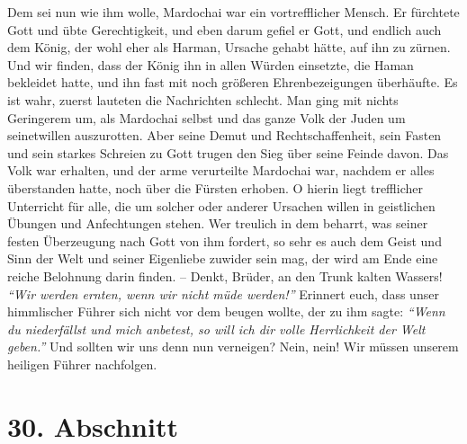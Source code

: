 Dem sei nun wie ihm wolle, Mardochai war ein vortrefflicher Mensch. Er fürchtete
Gott und übte Gerechtigkeit, und eben darum gefiel er Gott, und endlich auch dem
König, der wohl eher als Harman, Ursache gehabt hätte, auf ihn zu zürnen. Und
wir finden, dass der König ihn in allen Würden einsetzte, die Haman bekleidet
hatte, und ihn fast mit noch größeren Ehrenbezeigungen überhäufte. Es ist wahr,
zuerst lauteten die Nachrichten schlecht. Man ging mit nichts Geringerem um, als
Mardochai selbst und das ganze Volk der Juden um seinetwillen auszurotten. Aber
seine Demut und Rechtschaffenheit, sein Fasten und sein starkes
Schreien zu
Gott trugen den Sieg über seine Feinde davon. Das Volk war erhalten, und der
arme
verurteilte Mardochai war, nachdem er alles überstanden hatte, noch über die
Fürsten erhoben. O hierin liegt trefflicher Unterricht für alle, die um solcher
oder anderer Ursachen willen in geistlichen Übungen und Anfechtungen stehen.
Wer treulich in dem beharrt, was seiner festen Überzeugung
nach Gott von ihm
fordert, so sehr es auch dem Geist und Sinn der
Welt und seiner Eigenliebe
zuwider sein mag, der wird am Ende eine reiche Belohnung darin
finden. -- Denkt,
Brüder, an den Trunk kalten Wassers!
\textit{"`Wir werden ernten, wenn wir nicht müde
werden!"'}
Erinnert euch, dass unser himmlischer Führer sich nicht vor dem
beugen
wollte, der zu ihm sagte:
\textit{"`Wenn du niederfällst und mich anbetest, so will ich
dir volle Herrlichkeit der Welt geben."'}
Und sollten wir
uns denn nun verneigen? Nein, nein! Wir müssen unserem heiligen Führer
nachfolgen. 

\section{30. Abschnitt} \label{kap9_ab30}

